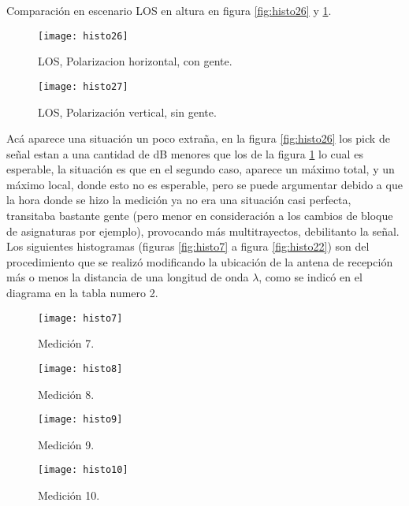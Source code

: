 \documentclass[12pt]{article}
\begin{document}
\normalsize
Comparación en escenario LOS en altura en figura \ref{fig:histo26} y \ref{fig:histo27}.
\begin{figure}[H]
\hfill
\begin{minipage}[t]{.45\textwidth}
  \centering
        \texttt{[image: histo26]}
		\caption{\footnotesize LOS, Polarizacion horizontal, con gente.}
\label{fig:histo26}
\end{minipage}
\hfill
\begin{minipage}[t]{.45\textwidth}
  \centering
        \texttt{[image: histo27]}
		\caption{\footnotesize LOS, Polarización vertical, sin gente.}
\label{fig:histo27}
\end{minipage}
\end{figure}
\footnotesize
Acá aparece una situación un poco extraña, en la figura \ref{fig:histo26} los pick de señal 
estan a una cantidad de dB menores que los de la figura \ref{fig:histo27} lo cual es esperable,
la situación es que en el segundo caso, aparece un máximo total, y un máximo local, donde esto no es
esperable, pero se puede argumentar debido a que la hora donde se hizo la medición ya no era
una situación casi perfecta, transitaba bastante gente (pero menor en consideración a los cambios
de bloque de asignaturas por ejemplo), provocando más multitrayectos, debilitanto la señal.\\

\normalsize
Los siguientes histogramas (figuras \ref{fig:histo7} a figura \ref{fig:histo22}) son del 
procedimiento que se realizó modificando la ubicación de la antena de recepción más o 
menos la distancia de una longitud de onda $\lambda$, como se indicó en el diagrama en la 
tabla numero 2.

\begin{figure}[H]
\hfill
\begin{minipage}[t]{.45\textwidth}
  \centering
        \texttt{[image: histo7]}
		\caption{\footnotesize Medición 7.}
\label{fig:histo7}
\end{minipage}
\hfill
\begin{minipage}[t]{.45\textwidth}
  \centering
        \texttt{[image: histo8]}
		\caption{\footnotesize Medición 8.}
\label{fig:histo8}
\end{minipage}
\end{figure}

\begin{figure}[H]
\hfill
\begin{minipage}[t]{.45\textwidth}
  \centering
        \texttt{[image: histo9]}
		\caption{\footnotesize Medición 9.}
\label{fig:histo9}
\end{minipage}
\hfill
\begin{minipage}[t]{.45\textwidth}
  \centering
        \texttt{[image: histo10]}
		\caption{\footnotesize Medición 10.}
\label{fig:histo10}
\end{minipage}
\end{figure}
\end{document}

